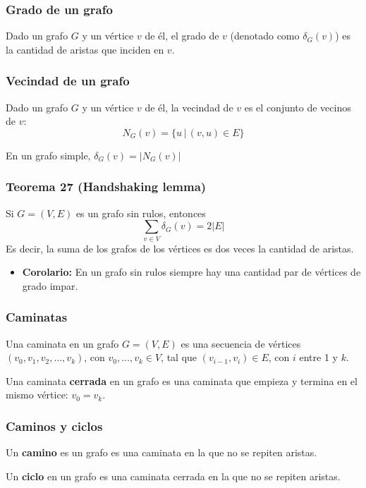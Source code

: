 \begin{multicols}{2}
    \subsubsection*{Grado de un grafo}
    Dado un grafo $G$ y un vértice $v$ de él, el grado de $v$ (denotado como $\delta_G(v)$) es la cantidad de aristas que inciden en $v$.
    
    \subsubsection*{Vecindad de un grafo}
    Dado un grafo $G$ y un vértice $v$ de él, la vecindad de $v$ es el conjunto de vecinos de $v$:
    $$
    N_G(v) = \{ u \,|\, (v,u) \in E \}
    $$
    
    En un grafo simple, $\delta_G(v) = |N_G(v)|$
    
    \subsubsection*{Teorema 27 (Handshaking lemma)}
    Si $G = (V,E)$ es un grafo sin rulos, entonces
    $$
    \sum_{v \in V} \delta_G(v) = 2|E|
    $$
    Es decir, la suma de los grafos de los vértices es dos veces la cantidad de aristas.
    
    \begin{itemize}
        \item \textbf{Corolario:} En un grafo sin rulos siempre hay una cantidad par de vértices de grado impar.
    \end{itemize}
    
    \subsubsection*{Caminatas}
    Una caminata en un grafo $G = (V,E)$ es una secuencia de vértices $(v_0, v_1, v_2, \ldots, v_k)$, con $v_0, \ldots, v_k \in V$, tal que $(v_{i - 1}, v_i) \in E$, con $i$ entre 1 y $k$. \p
    
    Una caminata \textbf{cerrada} en un grafo es una caminata que empieza y termina en el mismo vértice: $v_0 = v_k$.
    
    \subsubsection*{Caminos y ciclos}
    Un \textbf{camino} es un grafo es una caminata en la que no se repiten aristas. \p
    
    Un \textbf{ciclo} en un grafo es una caminata cerrada en la que no se repiten aristas.
    

\end{multicols}
